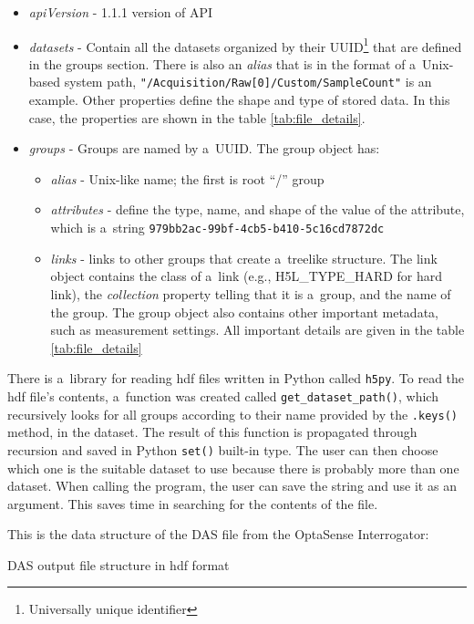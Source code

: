 \begin{itemize}
    \item \textit{apiVersion} - 1.1.1 version of API
    \item \textit{datasets} - Contain all the datasets organized by their UUID\footnote{Universally unique identifier} that are defined in the groups section. There is also an \textit{alias} that is in the format of a~Unix-based system path, \verb|"/Acquisition/Raw[0]/Custom/SampleCount"| is an example. Other properties define the shape and type of stored data. In this case, the properties are shown in the table \ref{tab:file_details}.
    \item \textit{groups} - Groups are named by a~UUID. The group object has:
        \begin{itemize}
            \item \textit{alias} - Unix-like name; the first is root ``/'' group
            \item \textit{attributes} - define the type, name, and shape of the value of the attribute, which is a~string \verb|979bb2ac-99bf-4cb5-b410-5c16cd7872dc|
            \item \textit{links} - links to other groups that create a~treelike structure. The link object contains the class of a~link (e.g., H5L\_TYPE\_HARD for hard link), the \textit{collection} property telling that it is a~group, and the name of the group. The group object also contains other important metadata, such as measurement settings. All important details are given in the table \ref{tab:file_details}
        \end{itemize}
\end{itemize}

There is a~library for reading \ac{hdf} files written in Python called \verb|h5py|. To read the \ac{hdf} file's contents, a~function was created called \verb|get_dataset_path()|, which recursively looks for all groups according to their name provided by the \verb|.keys()| method, in the dataset. The result of this function is propagated through recursion and saved in Python \verb|set()| built-in type. The user can then choose which one is the suitable dataset to use because there is probably more than one dataset. When calling the program, the user can save the string and use it as an argument. This saves time in searching for the contents of the file.

This is the data structure of the DAS file from the OptaSense Interrogator:

\bigskip
DAS output file structure in \ac{hdf} format
{\small
%
\label{dir:filestructure}
}
\bigskip

